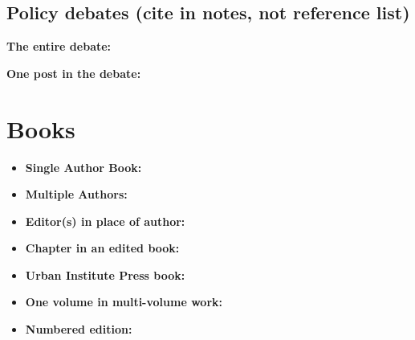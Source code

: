 \subsection{Policy debates (cite in notes, not reference list)}

\textbf{The entire debate:}

\noindent\textbf{One post in the debate:}

\section{Books}

\begin{itemize}
    \item \textbf{Single Author Book:} \citet{schwabish2020elevate}
    \item \textbf{Multiple Authors:} \citet{burman2020taxes}
    \item \textbf{Editor(s) in place of author:}
    \item \textbf{Chapter in an edited book:}
    \item \textbf{Urban Institute Press book:} \citet{cordes2009nonprofits}
    \item \textbf{One volume in multi-volume work:} \citet{bowen2021book}
    \item \textbf{Numbered edition:}
\end{itemize}

